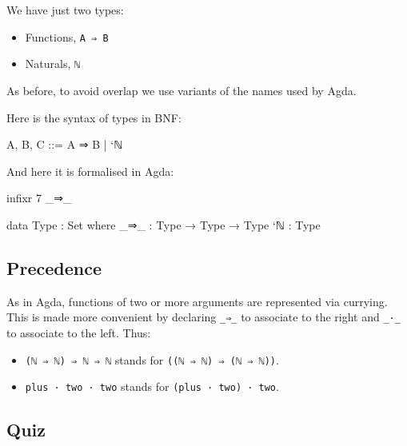 We have just two types:

\begin{itemize}
\tightlist
\item
  Functions, \texttt{A\ ⇒\ B}
\item
  Naturals, \texttt{\textasciigrave{}ℕ}
\end{itemize}

As before, to avoid overlap we use variants of the names used by Agda.

Here is the syntax of types in BNF:

\begin{myDisplay}
A, B, C  ::=  A ⇒ B | `ℕ
\end{myDisplay}

And here it is formalised in Agda:

\begin{fence}
\begin{code}
infixr 7 _⇒_

data Type : Set where
  _⇒_ : Type → Type → Type
  `ℕ : Type
\end{code}
\end{fence}

\hypertarget{precedence}{%
\subsection{Precedence}\label{precedence}}

As in Agda, functions of two or more arguments are represented via
currying. This is made more convenient by declaring \texttt{\_⇒\_} to
associate to the right and \texttt{\_·\_} to associate to the left.
Thus:

\begin{itemize}
\tightlist
\item
  \texttt{(\textasciigrave{}ℕ\ ⇒\ \textasciigrave{}ℕ)\ ⇒\ \textasciigrave{}ℕ\ ⇒\ \textasciigrave{}ℕ}
  stands for
  \texttt{((\textasciigrave{}ℕ\ ⇒\ \textasciigrave{}ℕ)\ ⇒\ (\textasciigrave{}ℕ\ ⇒\ \textasciigrave{}ℕ))}.
\item
  \texttt{plus\ ·\ two\ ·\ two} stands for
  \texttt{(plus\ ·\ two)\ ·\ two}.
\end{itemize}

\hypertarget{quiz-2}{%
\subsection{Quiz}\label{quiz-2}}

